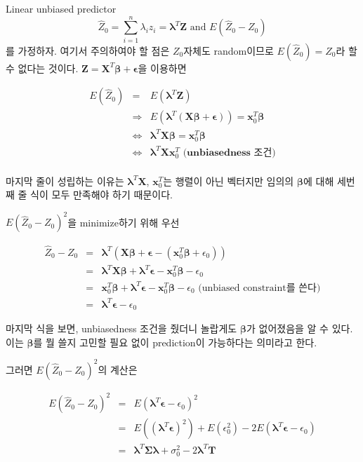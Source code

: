 \documentclass[b5paper,]{book}
\theoremstyle{definition}
\theoremstyle{definition}
\theoremstyle{definition}
\theoremstyle{remark}
\begin{document}
Linear unbiased predictor
\[\hat{Z}_{0}=\sum_{i=1}^{n}\lambda_{i}z_{i}=\boldsymbol{\lambda}^{T}\mathbf{Z} \text{ and } E(\hat{Z}_{0}-Z_{0})\]
를 가정하자. 여기서 주의하여야 할 점은 \(Z_{0}\)자체도 random이므로
\(E(\hat{Z}_{0})=Z_{0}\)라 할 수 없다는 것이다.
\(\mathbf{Z}=\boldsymbol{X}^{T}\boldsymbol{\beta}+\boldsymbol{\epsilon}\)을
이용하면

\begin{eqnarray*}
E(\hat{Z}_{0})&=&E(\boldsymbol{\lambda}^{T}\mathbf{Z})\\
&\Longrightarrow& E(\boldsymbol{\lambda}^{T}(\mathbf{X}\boldsymbol{\beta}+\boldsymbol{\epsilon}))=\mathbf{x}_{0}^{T}\boldsymbol{\beta}\\
&\Longleftrightarrow& \boldsymbol{\lambda}^{T}\mathbf{X}\boldsymbol{\beta}=\mathbf{x}_{0}^{T}\boldsymbol{\beta}\\
&\Longleftrightarrow& \boldsymbol{\lambda}^{T}\mathbf{X}\mathbf{x}_{0}^{T} \textbf{ (unbiasedness 조건)}\\
\end{eqnarray*}

마지막 줄이 성립하는 이유는 \(\boldsymbol{\lambda}^{T}\mathbf{X}\),
\(\mathbf{x}_{0}^{T}\)는 행렬이 아닌 벡터지만 임의의
\(\boldsymbol{\beta}\)에 대해 세번째 줄 식이 모두 만족해야 하기
때문이다.

\(E(\hat{Z}_{0}-Z_{0})^{2}\)을 minimize하기 위해 우선

\begin{eqnarray*}
\hat{Z}_{0}-Z_{0} &=& \boldsymbol{\lambda}^{T}(\mathbf{X}\boldsymbol{\beta}+\boldsymbol{\epsilon}-(\mathbf{x}_{0}^{T}\boldsymbol{\beta}+\epsilon_{0}))\\
&=&\boldsymbol{\lambda}^{T}\mathbf{X}\boldsymbol{\beta}+\boldsymbol{\lambda}^{T}\boldsymbol{\epsilon}-\mathbf{x}_{0}^{T}\boldsymbol{\beta}-\epsilon_{0}\\
&=&\mathbf{x}_{0}^{T}\boldsymbol{\beta}+\boldsymbol{\lambda}^{T}\boldsymbol{\epsilon}-\mathbf{x}_{0}^{T}\boldsymbol{\beta}-\epsilon_{0}\text{ (unbiased constraint를 쓴다)}\\
&=&\boldsymbol{\lambda}^{T}\boldsymbol{\epsilon}-\epsilon_{0}
\end{eqnarray*}

마지막 식을 보면, unbiasedness 조건을 줬더니 놀랍게도
\(\boldsymbol{\beta}\)가 없어졌음을 알 수 있다. 이는
\(\boldsymbol{\beta}\)를 뭘 쓸지 고민할 필요 없이 prediction이
가능하다는 의미라고 한다.

그러면 \(E(\hat{Z}_{0}-Z_{0})^{2}\)의 계산은

\begin{eqnarray*}
E(\hat{Z}_{0}-Z_{0})^{2}&=&E(\boldsymbol{\lambda}^{T}\boldsymbol{\epsilon}-\epsilon_{0})^{2}\\
&=&E((\boldsymbol{\lambda}^{T}\boldsymbol{\epsilon})^{2})+E(\epsilon_{0}^{2})-2E(\boldsymbol{\lambda}^{T}\boldsymbol{\epsilon}-\epsilon_{0})\\
&=&\boldsymbol{\lambda}^{T}\boldsymbol{\Sigma}\boldsymbol{\lambda}+\sigma_{0}^{2}-2\boldsymbol{\lambda}^{T}\mathbf{T}
\end{eqnarray*}
\end{document}
